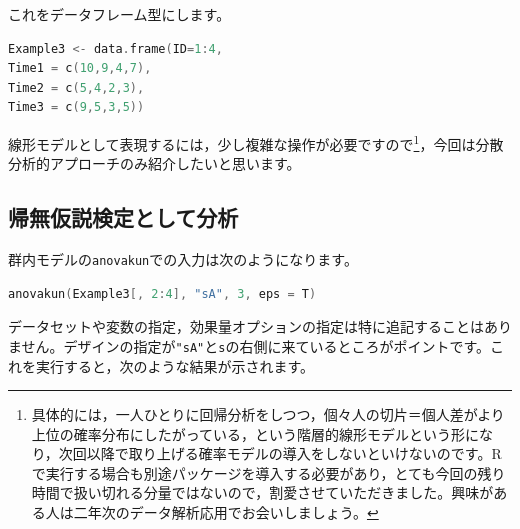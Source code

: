 \documentclass{ltjsarticle}
\begin{document}
これをデータフレーム型にします。
\begin{lstlisting}[language=c++]
Example3 <- data.frame(ID=1:4,
Time1 = c(10,9,4,7),
Time2 = c(5,4,2,3),
Time3 = c(9,5,3,5))
\end{lstlisting}

線形モデルとして表現するには，少し複雑な操作が必要ですので\footnote{具体的には，一人ひとりに回帰分析をしつつ，個々人の切片＝個人差がより上位の確率分布にしたがっている，という階層的線形モデルという形になり，次回以降で取り上げる確率モデルの導入をしないといけないのです。Rで実行する場合も別途パッケージを導入する必要があり，とても今回の残り時間で扱い切れる分量ではないので，割愛させていただきました。興味がある人は二年次のデータ解析応用でお会いしましょう。}，今回は分散分析的アプローチのみ紹介したいと思います。
\subsection{帰無仮説検定として分析}
群内モデルの\texttt{anovakun}での入力は次のようになります。
\begin{lstlisting}[language=c++]
anovakun(Example3[, 2:4], "sA", 3, eps = T)
\end{lstlisting}
データセットや変数の指定，効果量オプションの指定は特に追記することはありません。デザインの指定が\texttt{"sA"}と\texttt{s}の右側に来ているところがポイントです。これを実行すると，次のような結果が示されます。
\end{document}
